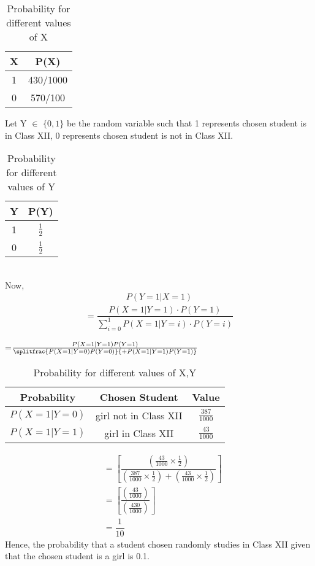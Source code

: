 \documentclass[journal,12pt,two column]{IEEEtran}
\begin{document}
\begin{table}[ht]
\caption{Probability for different values of X}
\begin{center}
\begin{tabular}{|c|c|}
    \hline
    X & P(X) \\
    \hline
    1 & 430/1000\\
    \hline
    0 & 570/100\\
    \hline
    \end{tabular} 
\end{center}
\end{table}
Let Y $\in$ $\{0,1\}$ be the random variable such that 1 represents chosen student is in Class XII, 0 represents chosen student is not in Class XII.
\begin{table}[ht]
\caption{Probability for different values of Y}
\begin{center}
    \begin{tabular}{|c|c|}
    \hline
    Y & P(Y)\\
    \hline
    1 & $\frac{1}{2}$ \\
    \hline
    0 & $\frac{1}{2}$\\
    \hline
    \end{tabular}
\end{center} 
\end{table}\\
Now,
\begin{align}
P(Y=1 \vert X=1)   
\end{align}
\begin{align}
=\dfrac{P(X=1\vert Y=1)\cdot P(Y=1)}{\sum_{i=0}^{1} P(X=1\vert Y=i)\cdot P(Y=i)}
\end{align}
\begin{center} 
=$\frac{P(X=1 \vert Y=1)P(Y=1)}{\splitfrac{P(X=1\vert Y=0)P(Y=0)}{+P(X=1\vert Y=1)P(Y=1)}}$
\end{center}
\begin{table}[ht]
\caption{Probability for different values of X,Y}
\begin{center}
    \begin{tabular}{|c|c|c|}
    \hline
    Probability & Chosen Student & Value\\
    \hline
    $P(X=1\vert Y=0)$ & girl not in Class XII & $\frac{387}{1000}$\\
    \hline
    $ P(X=1\vert Y=1)$ & girl in Class XII & $\frac{43}{1000}$ \\
    \hline
    \end{tabular}
\end{center}
\end{table} 
\begin{align}
&=\left[ \dfrac{\left( \frac{43}{1000}\times \frac{1}{2}\right)}{\left( \frac{387}{1000}\times \frac{1}{2} \right) + \left( \frac{43}{1000}\times \frac{1}{2} \right)}\right]\\
&=\left[ \dfrac{\left( \frac{43}{1000} \right)}{\left( \frac{430}{1000} \right)}\right]\\ 
&=\dfrac{1}{10} 
\end{align}
Hence, the probability that a student chosen randomly studies in Class XII given that the chosen student is a girl is 0.1.
\end{document}
